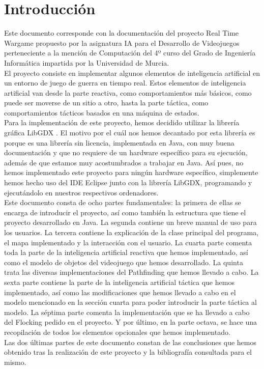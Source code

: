 \medskip
\section{Introducción}
Este documento corresponde con la documentación del proyecto Real Time Wargame propuesto por la asignatura IA para el Desarrollo de Videojuegos perteneciente a la mención de Computación del 4º curso del Grado de Ingeniería Informática impartida por la Universidad de Murcia. \\

El proyecto consiste en implementar algunos elementos de inteligencia artificial en un entorno de juego de guerra en tiempo real. Estos elementos de inteligencia artificial van desde la parte reactiva, como comportamientos más básicos, como puede ser moverse de un sitio a otro, hasta la parte táctica, como comportamientos tácticos basados en una máquina de estados. \\

Para la implementación de este proyecto, hemos decidido utilizar la librería gráfica LibGDX \cite{libgdx}. El motivo por el cuál nos hemos decantado por esta librería es porque es una librería sin licencia, implementada en Java, con muy buena documentación y que no requiere de un hardware específico para su ejecución, además de que estamos muy acostumbrados a trabajar en Java. Así pues, no hemos implementado este proyecto para ningún hardware específico, simplemente hemos hecho uso del IDE Eclipse junto con la librería LibGDX, programando y ejecutándolo en nuestros respectivos ordenadores. \\

Este documento consta de ocho partes fundamentales: la primera de ellas se encarga de introducir el proyecto, así como también la estructura que tiene el proyecto desarrollado en Java. La segunda contiene un breve manual de uso para los usuarios. La tercera contiene la explicación de la clase principal del programa, el mapa implementado y la interacción con el usuario. La cuarta parte comenta toda la parte de la inteligencia artificial reactiva que hemos implementado, así como el modelo de objetos del videojuego que hemos desarrollado. La quinta trata las diversas implementaciones del Pathfinding que hemos llevado a cabo. La sexta parte contiene la parte de la inteligencia artificial táctica que hemos implementado, así como las modificaciones que hemos llevado a cabo en el modelo mencionado en la sección cuarta para poder introducir la parte táctica al modelo. La séptima parte comenta la implementación que se ha llevado a cabo del Flocking pedido en el proyecto. Y por último, en la parte octava, se hace una recopilación de todos los elementos opcionales que hemos implementado. \\

Las dos últimas partes de este documento constan de las conclusiones que hemos obtenido tras la realización de este proyecto y la bibliografía consultada para el mismo.

